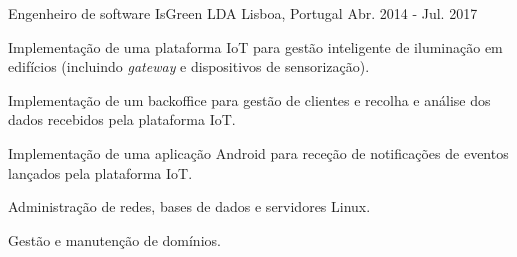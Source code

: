 


\begin{cventries}


\cventry
{Engenheiro de software} %
{IsGreen LDA} %
{Lisboa, Portugal} %
{Abr. 2014 - Jul. 2017} %
{ %
\begin{cvitems}
\item {Implementação de uma plataforma IoT para gestão inteligente de iluminação em edifícios (incluindo \textit{gateway} e dispositivos de sensorização).}
\item {Implementação de um backoffice para gestão de clientes e recolha e análise dos dados recebidos pela plataforma IoT.}
\item {Implementação de uma aplicação Android para receção de notificações de eventos lançados pela plataforma IoT.}
\item {Administração de redes, bases de dados e servidores Linux.}
\item {Gestão e manutenção de domínios.}
\end{cvitems}
}


\end{cventries}